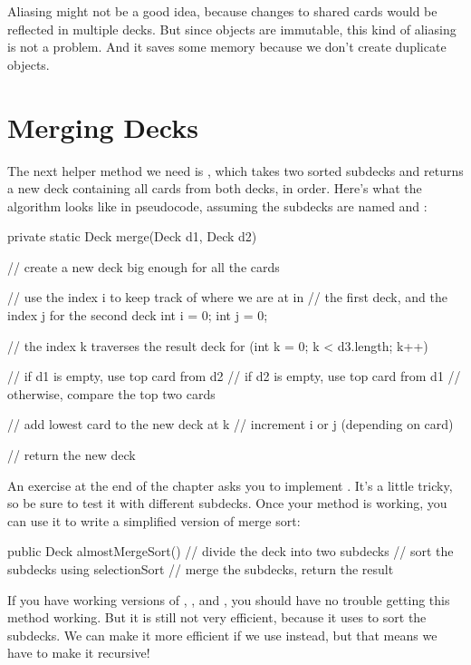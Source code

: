 
Aliasing might not be a good idea, because changes to shared cards would be reflected in multiple decks.
But since  objects are immutable, this kind of aliasing is not a problem.
And it saves some memory because we don't create duplicate  objects.


\section{Merging Decks}


The next helper method we need is , which takes two sorted subdecks and returns a new deck containing all cards from both decks, in order.
Here's what the algorithm looks like in pseudocode, assuming the subdecks are named  and :

\begin{code}
private static Deck merge(Deck d1, Deck d2) {
    // create a new deck big enough for all the cards

    // use the index i to keep track of where we are at in
    // the first deck, and the index j for the second deck
    int i = 0;
    int j = 0;

    // the index k traverses the result deck
    for (int k = 0; k < d3.length; k++) {

        // if d1 is empty, use top card from d2
        // if d2 is empty, use top card from d1
        // otherwise, compare the top two cards

        // add lowest card to the new deck at k
        // increment i or j (depending on card)
    }
    // return the new deck
}
\end{code}

An exercise at the end of the chapter asks you to implement .
It's a little tricky, so be sure to test it with different subdecks.
Once your  method is working, you can use it to write a simplified version of merge sort:

\begin{code}
public Deck almostMergeSort() {
    // divide the deck into two subdecks
    // sort the subdecks using selectionSort
    // merge the subdecks, return the result
}
\end{code}

If you have working versions of , , and , you should have no trouble getting this method working.
But it is still not very efficient, because it uses  to sort the subdecks.
We can make it more efficient if we use  instead, but that means we have to make it recursive!

